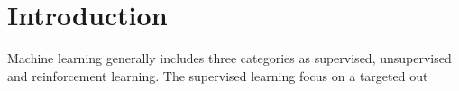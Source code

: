 \section{Introduction}

Machine learning generally includes three categories as supervised, unsupervised and reinforcement learning. The supervised learning focus on a targeted out
